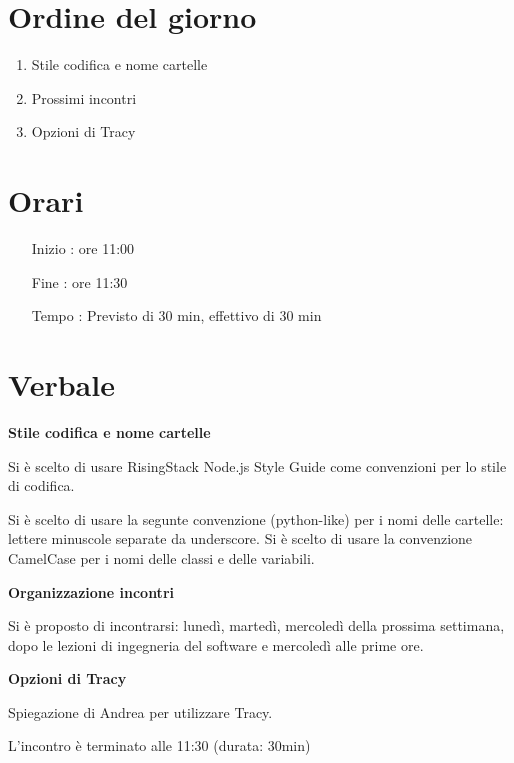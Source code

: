 \documentclass[11pt]{meetingmins}
\begin{document}
\maketitle

\section{Ordine del giorno}

\begin{enumerate}

  \item Stile codifica e nome cartelle
  \item Prossimi incontri
  \item Opzioni di Tracy

\end{enumerate}

\section{Orari}

\begin{itemize}
\item[Inizio]: ore 11:00
\item[Fine]: ore 11:30
\item[Tempo]: Previsto di 30 min, effettivo di 30 min

\end{itemize}

\section{Verbale}

\textbf{Stile codifica e nome cartelle}

Si \`{e} scelto di usare RisingStack Node.js Style Guide come convenzioni per lo stile di codifica.

Si \`{e} scelto di usare la segunte convenzione (python-like) per i nomi delle cartelle: lettere minuscole separate da underscore.
Si \`{e} scelto di usare la convenzione CamelCase per i nomi delle classi e delle variabili.

\textbf{Organizzazione incontri}

Si \`{e} proposto di incontrarsi: luned\`{i}, marted\`{i}, mercoled\`{i} della prossima settimana, dopo le lezioni di ingegneria del software e mercoled\`{i} alle prime ore.

\textbf{Opzioni di Tracy}

Spiegazione di Andrea per utilizzare Tracy.

L'incontro è terminato alle 11:30 (durata: 30min)\\

\end{document}
